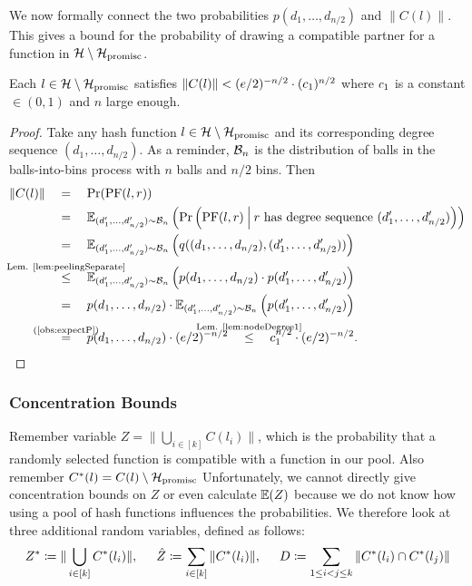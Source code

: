 \documentclass[a4paper,USenglish,cleveref]{lipics-v2021}
\def\refRelLem#1#2{\stackrel{\mathclap{\text{Lem. \ref{#1}}}}{#2}\quad}
\def\refRelEq#1#2{\stackrel{\mathclap{\text{(\ref{#1})}}}{#2}\quad}
\def\cond{\hspace{0.8mm}\middle\vert\hspace{0.8mm}}
\begin{document}
We now formally connect the two probabilities $p(d_1,\ldots,d_{n/2})$ and $\|C(l)\|$.
This gives a bound for the probability of drawing a compatible partner for a function in $\mathcal{H}\setminus\mathcal{H}_{\textrm{promisc}}$.

\begin{lemma}
  Each $l \in \mathcal{H}\setminus\mathcal{H}_{\textrm{promisc}}$ satisfies $\|C(l)\| < (e/2)^{-n/2} \cdot (c_1)^{n/2}$ where $c_1$ is a constant $\in (0, 1)$ and $n$ large enough.
  \label{lem:maxC}
\end{lemma}
\begin{proof}
  Take any hash function $l \in \mathcal{H}\setminus\mathcal{H}_{\textrm{promisc}}$ and its corresponding degree sequence $(d_1, \ldots, d_{n/2})$.
  As a reminder, $\mathcal{B}_n$ is the distribution of balls in the balls-into-bins process with $n$ balls and $n/2$ bins.
  Then
  \begin{align*}
    \|C(l)\| \quad
      &=\quad \Pr(\PF(l, r))\\
      &=\quad \expect_{(d'_1, \ldots, d'_{n/2}) \sim \B_n}\left(\Pr\left(\PF(l, r) \cond r \textrm{ has degree sequence } (d'_1, \ldots, d'_{n/2})\right)\right)\\
      &=\quad \expect_{(d'_1, \ldots, d'_{n/2}) \sim \B_n}\left(q((d_1, \ldots, d_{n/2}), (d'_1, \ldots, d'_{n/2}))\right)\\
      &\refRelLem{lem:peelingSeparate}{\leq} \expect_{(d'_1, \ldots, d'_{n/2}) \sim \B_n}\left(p(d_1, \ldots, d_{n/2}) \cdot p(d'_1, \ldots, d'_{n/2})\right)\\
      &=\quad p(d_1, \ldots, d_{n/2}) \cdot \expect_{(d'_1, \ldots, d'_{n/2}) \sim \B_n}\left(p(d'_1, \ldots, d'_{n/2})\right)\\
      &\refRelEq{obs:expectP}{=} p(d_1, \ldots, d_{n/2}) \cdot (e/2)^{-n/2}
      \quad\refRelLem{lem:nodeDegree1}{\leq} \constantMaxC^{n/2} \cdot (e/2)^{-n/2}.
    \tag*{\qedhere}
  \end{align*}
\end{proof}

\subsubsection{Concentration Bounds} \label{s:concentrationBounds}
Remember variable $Z = \|\bigcup_{i \in [k]} C(l_i)\|$, which is the probability that a randomly selected function is compatible with a function in our pool.
Also remember $C^*(l)=C(l)\setminus\mathcal{H}_{\textrm{promisc}}$
Unfortunately, we cannot directly give concentration bounds on $Z$ or even calculate $\mathbb{E}(Z)$ because we do not know how using a pool of hash functions influences the probabilities.
We therefore look at three additional random variables, defined as follows:
\begin{align*}
  Z^* \coloneqq \|\bigcup_{i \in [k]} C^*(l_i)\|,
  \hspace{5mm}
  \hat Z \coloneqq \sum_{i \in [k]} \|C^*(l_i)\|,
  \hspace{5mm}
  D \coloneqq \sum_{1 \leq i < j \leq k} \|C^*(l_i) \cap C^*(l_j)\|
\end{align*}
\end{document}
